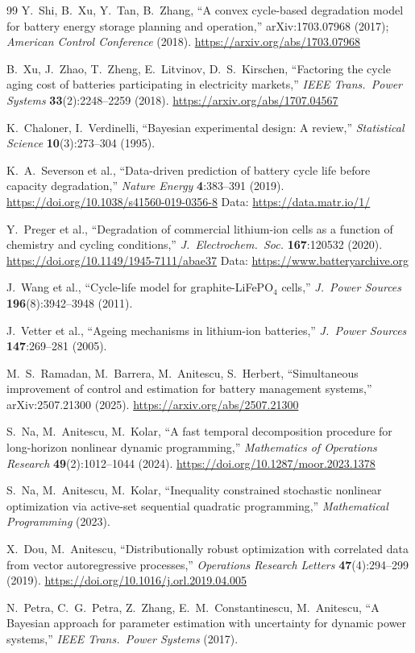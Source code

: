 \documentclass[11pt,letterpaper]{article}
\begin{document}
\begin{thebibliography}{99}
 Y.~Shi, B.~Xu, Y.~Tan, B.~Zhang, ``A convex cycle-based degradation model for battery energy storage planning and operation,'' arXiv:1703.07968 (2017); \emph{American Control Conference} (2018). \url{https://arxiv.org/abs/1703.07968}

 B.~Xu, J.~Zhao, T.~Zheng, E.~Litvinov, D.~S.~Kirschen, ``Factoring the cycle aging cost of batteries participating in electricity markets,'' \emph{IEEE Trans.\ Power Systems} \textbf{33}(2):2248--2259 (2018). \url{https://arxiv.org/abs/1707.04567}

 K.~Chaloner, I.~Verdinelli, ``Bayesian experimental design: A review,'' \emph{Statistical Science} \textbf{10}(3):273--304 (1995).

 K.~A.~Severson et al., ``Data-driven prediction of battery cycle life before capacity degradation,'' \emph{Nature Energy} \textbf{4}:383--391 (2019). \url{https://doi.org/10.1038/s41560-019-0356-8} Data: \url{https://data.matr.io/1/}

 Y.~Preger et al., ``Degradation of commercial lithium-ion cells as a function of chemistry and cycling conditions,'' \emph{J.\ Electrochem.\ Soc.} \textbf{167}:120532 (2020). \url{https://doi.org/10.1149/1945-7111/abae37} Data: \url{https://www.batteryarchive.org}

 J.~Wang et al., ``Cycle-life model for graphite-LiFePO$_4$ cells,'' \emph{J.\ Power Sources} \textbf{196}(8):3942--3948 (2011).

 J.~Vetter et al., ``Ageing mechanisms in lithium-ion batteries,'' \emph{J.\ Power Sources} \textbf{147}:269--281 (2005).

 M.~S.~Ramadan, M.~Barrera, M.~Anitescu, S.~Herbert, ``Simultaneous improvement of control and estimation for battery management systems,'' arXiv:2507.21300 (2025). \url{https://arxiv.org/abs/2507.21300}

 S.~Na, M.~Anitescu, M.~Kolar, ``A fast temporal decomposition procedure for long-horizon nonlinear dynamic programming,'' \emph{Mathematics of Operations Research} \textbf{49}(2):1012--1044 (2024). \url{https://doi.org/10.1287/moor.2023.1378}

 S.~Na, M.~Anitescu, M.~Kolar, ``Inequality constrained stochastic nonlinear optimization via active-set sequential quadratic programming,'' \emph{Mathematical Programming} (2023).

 X.~Dou, M.~Anitescu, ``Distributionally robust optimization with correlated data from vector autoregressive processes,'' \emph{Operations Research Letters} \textbf{47}(4):294--299 (2019). \url{https://doi.org/10.1016/j.orl.2019.04.005}

 N.~Petra, C.~G.~Petra, Z.~Zhang, E.~M.~Constantinescu, M.~Anitescu, ``A Bayesian approach for parameter estimation with uncertainty for dynamic power systems,'' \emph{IEEE Trans.\ Power Systems} (2017).

\end{thebibliography}
\end{document}
